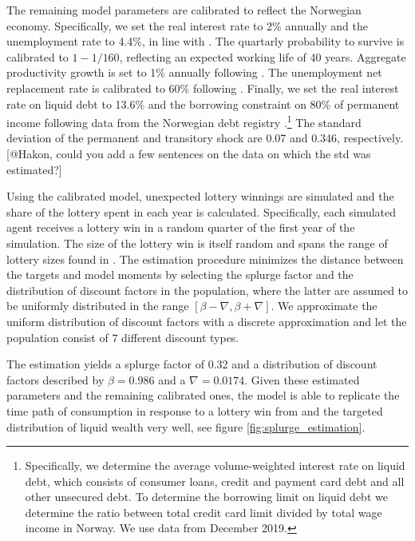 The remaining model parameters are calibrated to reflect the Norwegian economy. Specifically, we set the real interest rate to 2\% annually and the unemployment rate to 4.4\%, in line with \citet{aursland_state-dependent_2020}. The quartarly probability to survive is calibrated to $1-1/160$, reflecting an expected working life of 40 years. Aggregate productivity growth is set to 1\% annually following \citet{kravik_navigating_2019}. The unemployment net replacement rate is calibrated to 60\% following \citet{oecd_net_2020}. Finally, we set the real interest rate on liquid debt to 13.6\% and the borrowing constraint on 80\% of permanent income following data from the Norwegian debt registry \citet{gjeldsregistret_nokkeltall_2022}.\footnote{Specifically, we determine the average volume-weighted interest rate on liquid debt, which consists of consumer loans, credit and payment card debt and all other unsecured debt. To determine the borrowing limit on liquid debt we determine the ratio between total credit card limit divided by total wage income in Norway. We use data from December 2019.} The standard deviation of the permanent and transitory shock are 0.07 and 0.346, respectively. [@Hakon, could you add a few sentences on the data on which the std was estimated?]

Using the calibrated model, unexpected lottery winnings are simulated and the share of the lottery spent in each year is calculated. Specifically, each simulated agent receives a lottery win in a random quarter of the first year of the simulation. The size of the lottery win is itself random and spans the range of lottery sizes found in \citet{fagereng_mpc_2021}. The estimation procedure minimizes the distance between the targets and model moments by selecting the splurge factor and the distribution of discount factors in the population, where the latter are assumed to be uniformly distributed in the range $[\beta-\nabla, \beta+\nabla]$. We approximate the uniform distribution of discount factors with a discrete approximation and let the population consist of $7$ different discount types.

The estimation yields a splurge factor of 0.32 and a distribution of discount factors described by $\beta = 0.986$ and a $\nabla=0.0174$. Given these estimated parameters and the remaining calibrated ones, the model is able to replicate the time path of consumption in response to a lottery win from \citet{fagereng_mpc_2021} and the targeted distribution of liquid wealth very well, see figure \ref{fig:splurge_estimation}.
